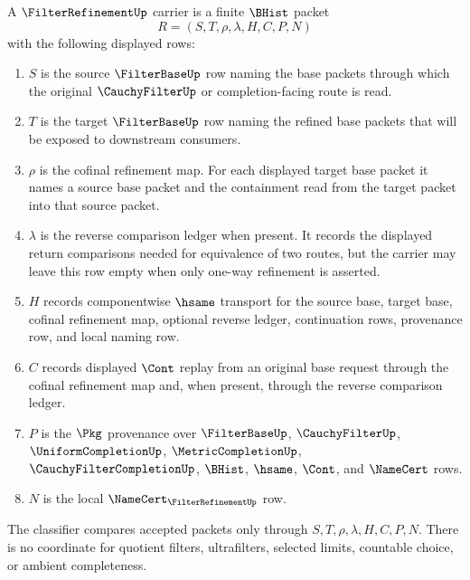 \begin{definition}
\label{def:filter-refinement-namecert-surface}
A $\FilterRefinementUp$ carrier is a finite $\BHist$ packet
$$
R=(S,T,\rho,\lambda,H,C,P,N)
$$
with the following displayed rows:
\begin{enumerate}
\item $S$ is the source $\FilterBaseUp$ row naming the base packets through which the original $\CauchyFilterUp$ or completion-facing route is read.
\item $T$ is the target $\FilterBaseUp$ row naming the refined base packets that will be exposed to downstream consumers.
\item $\rho$ is the cofinal refinement map. For each displayed target base packet it names a source base packet and the containment read from the target packet into that source packet.
\item $\lambda$ is the reverse comparison ledger when present. It records the displayed return comparisons needed for equivalence of two routes, but the carrier may leave this row empty when only one-way refinement is asserted.
\item $H$ records componentwise $\hsame$ transport for the source base, target base, cofinal refinement map, optional reverse ledger, continuation rows, provenance row, and local naming row.
\item $C$ records displayed $\Cont$ replay from an original base request through the cofinal refinement map and, when present, through the reverse comparison ledger.
\item $P$ is the $\Pkg$ provenance over $\FilterBaseUp$, $\CauchyFilterUp$, $\UniformCompletionUp$, $\MetricCompletionUp$, $\CauchyFilterCompletionUp$, $\BHist$, $\hsame$, $\Cont$, and $\NameCert$ rows.
\item $N$ is the local $\NameCert_{\FilterRefinementUp}$ row.
\end{enumerate}
The classifier compares accepted packets only through $S,T,\rho,\lambda,H,C,P,N$. There is no coordinate for quotient filters, ultrafilters, selected limits, countable choice, or ambient completeness.
\end{definition}

